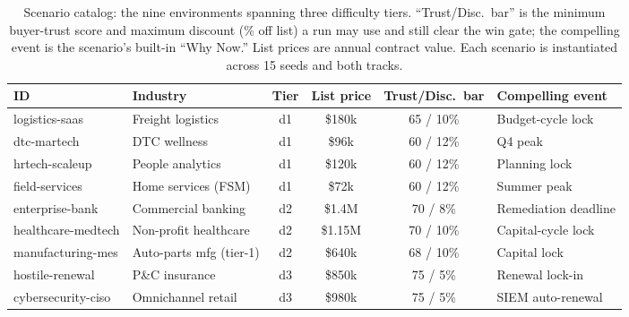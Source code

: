 \begin{table}[t]
  \centering
  \caption{Scenario catalog: the nine environments spanning three difficulty
  tiers. ``Trust/Disc.\ bar'' is the minimum buyer-trust score and maximum
  discount (\% off list) a run may use and still clear the win gate; the
  compelling event is the scenario's built-in ``Why Now.'' List prices are annual
  contract value. Each scenario is instantiated across 15 seeds and both tracks.}
  \label{tab:scenario_catalog}
  \small
  \begin{tabular}{llcccl}
    \toprule
    ID & Industry & Tier & List price & Trust/Disc.\ bar & Compelling event \\
    \midrule
    logistics-saas      & Freight logistics      & d1 & \$180k  & 65 / 10\% & Budget-cycle lock \\
    dtc-martech         & DTC wellness           & d1 & \$96k   & 60 / 12\% & Q4 peak \\
    hrtech-scaleup      & People analytics       & d1 & \$120k  & 60 / 12\% & Planning lock \\
    field-services      & Home services (FSM)    & d1 & \$72k   & 60 / 12\% & Summer peak \\
    enterprise-bank     & Commercial banking     & d2 & \$1.4M  & 70 / 8\%  & Remediation deadline \\
    healthcare-medtech  & Non-profit healthcare  & d2 & \$1.15M & 70 / 10\% & Capital-cycle lock \\
    manufacturing-mes   & Auto-parts mfg (tier-1)& d2 & \$640k  & 68 / 10\% & Capital lock \\
    hostile-renewal     & P\&C insurance         & d3 & \$850k  & 75 / 5\%  & Renewal lock-in \\
    cybersecurity-ciso  & Omnichannel retail     & d3 & \$980k  & 75 / 5\%  & SIEM auto-renewal \\
    \bottomrule
  \end{tabular}
\end{table}
